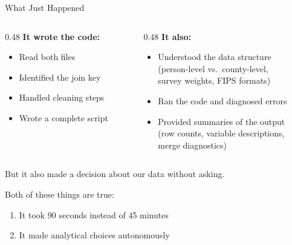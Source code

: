 \documentclass[aspectratio=169, 11pt]{beamer}
\begin{document}

\begin{frame}{What Just Happened}
  \begin{columns}[T]
    \begin{column}{0.48\textwidth}
      \textbf{It wrote the code:}
      \begin{itemize}
        \item Read both files
        \item Identified the join key
        \item Handled cleaning steps
        \item Wrote a complete script
      \end{itemize}
    \end{column}
    \begin{column}{0.48\textwidth}
      \textbf{It also:}
      \begin{itemize}
        \item Understood the data structure\\
          {\small (person-level vs.\ county-level,\\survey weights, FIPS formats)}
        \item Ran the code and diagnosed errors
        \item Provided summaries of the output\\
          {\small (row counts, variable descriptions,\\merge diagnostics)}
      \end{itemize}
    \end{column}
  \end{columns}

  \vspace{0.5em}
  \alert{But it also made a decision about our data without asking.}

  \vspace{0.5em}
  Both of these things are true:
  \begin{enumerate}
    \item It took 90 seconds instead of 45 minutes
    \item It made analytical choices autonomously
  \end{enumerate}
\end{frame}
\end{document}
